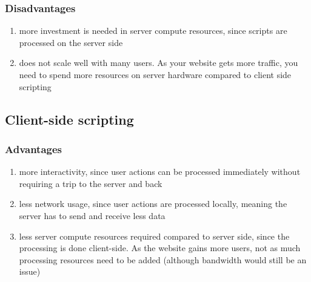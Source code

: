 \subsubsection*{Disadvantages}
\begin{enumerate}
  \item more investment is needed in server compute resources, since scripts are
    processed on the server side
  \item does not scale well with many users. As your website gets more traffic,
    you need to spend more resources on server hardware compared to client side
    scripting
\end{enumerate}

\subsection*{Client-side scripting}
\subsubsection*{Advantages}
\begin{enumerate}
  \item more interactivity, since user actions can be processed immediately
    without requiring a trip to the server and back
  \item less network usage, since user actions are processed locally, meaning
    the server has to send and receive less data
  \item less server compute resources required compared to server side, since
    the processing is done client-side. As the website gains more users, not as
    much processing resources need to be added (although bandwidth would still
    be an issue)
\end{enumerate}
